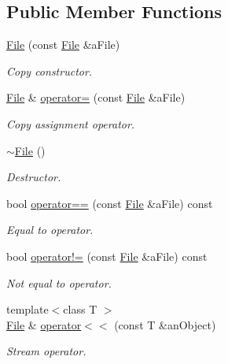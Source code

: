 \subsection*{Public Member Functions}
\begin{DoxyCompactItemize}
\item 
\hyperlink{classostk_1_1core_1_1fs_1_1_file_ad1695224996950be9962b8457da369b3}{File} (const \hyperlink{classostk_1_1core_1_1fs_1_1_file}{File} \&a\+File)
\begin{DoxyCompactList}\small\item\em Copy constructor. \end{DoxyCompactList}\item 
\hyperlink{classostk_1_1core_1_1fs_1_1_file}{File} \& \hyperlink{classostk_1_1core_1_1fs_1_1_file_a497eeaad4b643dc25856e2dcfdda49c4}{operator=} (const \hyperlink{classostk_1_1core_1_1fs_1_1_file}{File} \&a\+File)
\begin{DoxyCompactList}\small\item\em Copy assignment operator. \end{DoxyCompactList}\item 
\hyperlink{classostk_1_1core_1_1fs_1_1_file_afd7c6c0daabedeecc958348d01595b05}{$\sim$\+File} ()
\begin{DoxyCompactList}\small\item\em Destructor. \end{DoxyCompactList}\item 
bool \hyperlink{classostk_1_1core_1_1fs_1_1_file_a293348f9363e8b7544b684ffd12a63f8}{operator==} (const \hyperlink{classostk_1_1core_1_1fs_1_1_file}{File} \&a\+File) const
\begin{DoxyCompactList}\small\item\em Equal to operator. \end{DoxyCompactList}\item 
bool \hyperlink{classostk_1_1core_1_1fs_1_1_file_a96e2f605d1599c6c7368037917ababa9}{operator!=} (const \hyperlink{classostk_1_1core_1_1fs_1_1_file}{File} \&a\+File) const
\begin{DoxyCompactList}\small\item\em Not equal to operator. \end{DoxyCompactList}\item 
{\footnotesize template$<$class T $>$ }\\\hyperlink{classostk_1_1core_1_1fs_1_1_file}{File} \& \hyperlink{classostk_1_1core_1_1fs_1_1_file_a2521124159897934f1a85144511043f7}{operator$<$$<$} (const T \&an\+Object)
\begin{DoxyCompactList}\small\item\em Stream operator. \end{DoxyCompactList}\item 

\end{DoxyCompactItemize}
